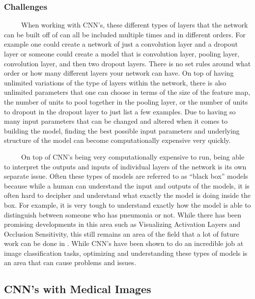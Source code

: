 \documentclass[12pt]{article}
\begin{document}
\hypertarget{challenges}{%
\subsubsection{Challenges}\label{challenges}}

~~~~~When working with CNN's, these different types of layers that the
network can be built off of can all be included multiple times and in
different orders. For example one could create a network of just a
convolution layer and a dropout layer or someone could create a model
that is convolution layer, pooling layer, convolution layer, and then
two dropout layers. There is no set rules around what order or how many
different layers your network can have. On top of having unlimited
variations of the type of layers within the network, there is also
unlimited parameters that one can choose in terms of the size of the
feature map, the number of units to pool together in the pooling layer,
or the number of units to dropout in the dropout layer to just list a
few examples. Due to having so many input parameters that can be changed
and altered when it comes to building the model, finding the best
possible input parameters and underlying structure of the model can
become computationally expensive very quickly.

~~~~~On top of CNN's being very computationally expensive to run, being
able to interpret the outputs and inputs of individual layers of the
network is its own separate issue. Often these types of models are
referred to as ``black box'' models because while a human can understand
the input and outputs of the models, it is often hard to decipher and
understand what exactly the model is doing inside the box. For example,
it is very tough to understand exactly how the model is able to
distinguish between someone who has pneumonia or not. While there has
been promising developments in this area such as Visualizing Activation
Layers and Occlusion Sensitivity, this still remains an area of the
field that a lot of future work can be done in \citep{Deep}. While CNN's
have been shown to do an incredible job at image classification tasks,
optimizing and understanding these types of models is an area that can
cause problems and issues.

\hypertarget{cnns-with-medical-images}{%
\subsection{CNN's with Medical Images}\label{cnns-with-medical-images}}
\end{document}
